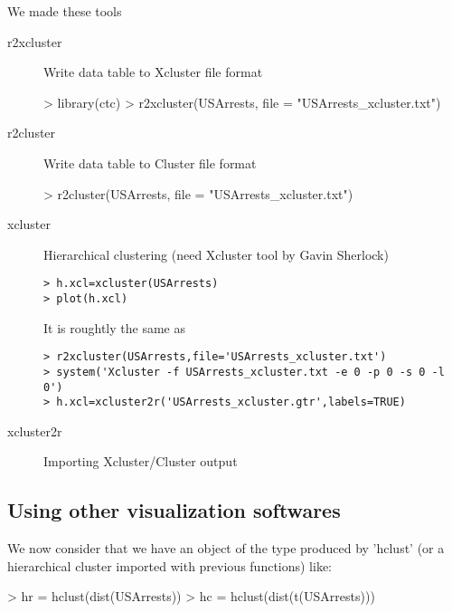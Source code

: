\documentclass[a4paper]{article}
\begin{document}
We made these tools
\begin{description}
\item[r2xcluster] Write data table to Xcluster file format 
\begin{Schunk}
\begin{Sinput}
> library(ctc)
> r2xcluster(USArrests, file = "USArrests_xcluster.txt")
\end{Sinput}
\end{Schunk}
 \item[r2cluster] Write data table to Cluster file format 
\begin{Schunk}
\begin{Sinput}
> r2cluster(USArrests, file = "USArrests_xcluster.txt")
\end{Sinput}
\end{Schunk}
\item[xcluster] Hierarchical clustering (need Xcluster tool  by Gavin Sherlock) 
\begin{verbatim}
> h.xcl=xcluster(USArrests)
> plot(h.xcl)
\end{verbatim}
 
It is roughtly the same as
\begin{verbatim}
> r2xcluster(USArrests,file='USArrests_xcluster.txt')
> system('Xcluster -f USArrests_xcluster.txt -e 0 -p 0 -s 0 -l 0')
> h.xcl=xcluster2r('USArrests_xcluster.gtr',labels=TRUE)
\end{verbatim}


\item[xcluster2r] Importing Xcluster/Cluster output 

\end{description}                 

\subsection{Using other visualization softwares}

We now consider that we have an object of the type produced by 'hclust'
(or a hierarchical cluster imported with previous functions) like:

\begin{Schunk}
\begin{Sinput}
> hr = hclust(dist(USArrests))
> hc = hclust(dist(t(USArrests)))
\end{Sinput}
\end{Schunk}
\end{document}
